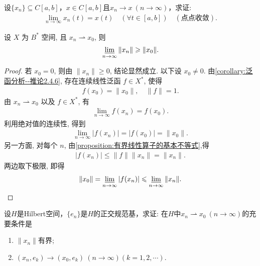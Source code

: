 \documentclass[../../main.tex]{subfiles}%
\begin{document}
\begin{example}
设$\{x_n\}\subseteq C[a,b]$，$x\in C[a,b]$且$x_n\to x\ (n\to\infty)$，求证:
\begin{align*}
\lim\limits_{n\to\infty}x_n(t)=x(t)\quad(\forall t\in[a,b])\quad(\text{点点收敛}).
\end{align*}
\end{example}


\begin{proposition}[范数关于弱收敛的下半连续性]\label{proposition:范数关于弱收敛的下半连续性}
设 $X$ 为 $B^*$ 空间, 且 $x_n\rightharpoonup x_0$, 则
\begin{align*}
\varliminf\limits_{n\to\infty}\|x_n\|
\geqslant\|x_0\|.
\end{align*}
\end{proposition}
\begin{proof}
若 $x_0=0$, 则由 $\|x_n\|\geqslant0$, 结论显然成立.
以下设 $x_0\neq0$.
由\cref{corollary:泛函分析--推论2.4.6}, 存在连续线性泛函 $f\in X^*$, 使得
\begin{align*}
f(x_0)=\|x_0\|,\quad \|f\|=1.
\end{align*}
由 $x_n\rightharpoonup x_0$ 以及 $f\in X^*$, 有
\begin{align*}
\lim\limits_{n\to\infty}f(x_n)=f(x_0).
\end{align*}
利用绝对值的连续性, 得到
\begin{align*}
\lim\limits_{n\to\infty}|f(x_n)|
=|f(x_0)|
=\|x_0\|.
\end{align*}
另一方面, 对每个 $n$, 由\cref{proposition:有界线性算子的基本不等式},得
\begin{align*}
|f(x_n)|
\leqslant\|f\|\|x_n\|
=\|x_n\|.
\end{align*}
两边取下极限, 即得
\begin{align*}
\|x_0\|
=
\varliminf\limits_{n\to\infty}|f(x_n)|
\leqslant
\varliminf\limits_{n\to\infty}\|x_n\|.
\end{align*}
\end{proof}

\begin{example}
设$H$是Hilbert空间，$\{e_n\}$是$H$的正交规范基，求证: 在$H$中$x_n\rightharpoonup x_0\ (n\to\infty)$的充要条件是
\begin{enumerate}[(1)]
\item $\|x_n\|$有界;
\item $(x_n,e_k)\to(x_0,e_k)\ (n\to\infty)(k=1,2,\cdots)$.
\end{enumerate}
\end{example}
\end{document}

